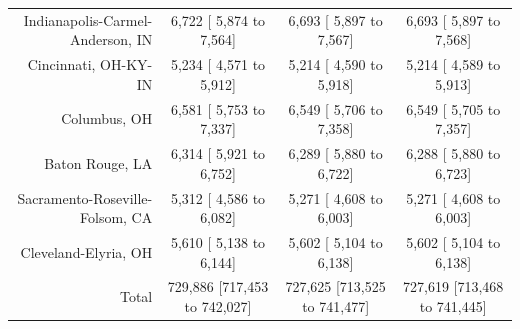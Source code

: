 \documentclass{article}
\begin{document}
\begin{table}[H]
\begin{tabular}{|r|c|c|c|}
		Indianapolis-Carmel-Anderson, IN &   6,722 [  5,874 to   7,564] &   6,693 [  5,897 to   7,567] &   6,693 [  5,897 to   7,568]\\
		Cincinnati, OH-KY-IN &   5,234 [  4,571 to   5,912] &   5,214 [  4,590 to   5,918] &   5,214 [  4,589 to   5,913]\\
		Columbus, OH &   6,581 [  5,753 to   7,337] &   6,549 [  5,706 to   7,358] &   6,549 [  5,705 to   7,357]\\
		Baton Rouge, LA &   6,314 [  5,921 to   6,752] &   6,289 [  5,880 to   6,722] &   6,288 [  5,880 to   6,723]\\
		Sacramento-Roseville-Folsom, CA &   5,312 [  4,586 to   6,082] &   5,271 [  4,608 to   6,003] &   5,271 [  4,608 to   6,003]\\
		Cleveland-Elyria, OH &   5,610 [  5,138 to   6,144] &   5,602 [  5,104 to   6,138] &   5,602 [  5,104 to   6,138]\\
		\hline
		Total & 729,886 [717,453 to 742,027] & 727,625 [713,525 to 741,477] & 727,619 [713,468 to 741,445]\\
		\hline
	\end{tabular}
\end{table}
\end{document}
